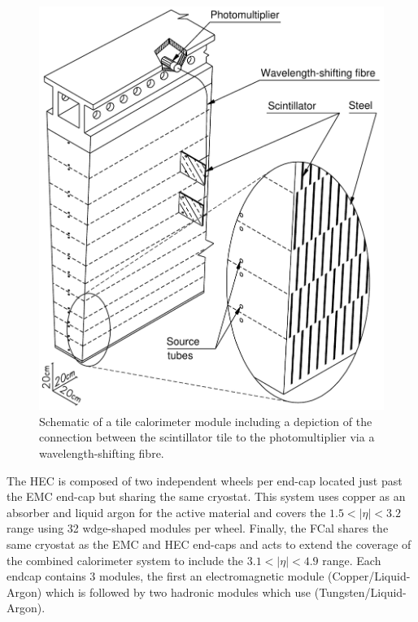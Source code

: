 \begin{figure}[!htbp]
  \begin{center}
    \includegraphics[width=0.8\linewidth]{figures/atlas/tile_calorimeter.pdf}
    \caption{ \cite{PERF-2007-01} Schematic of a tile calorimeter module
including a depiction of the connection between the scintillator tile to the
photomultiplier via a wavelength-shifting fibre.}
    \label{fig:tile_calorimeter}
  \end{center}
\end{figure}

The HEC is composed of two independent wheels per end-cap located just past the
EMC end-cap but sharing the same cryostat. This system  uses copper as an
absorber and liquid argon for the active material and covers the $1.5 < |\eta| <
3.2$ range using 32 wdge-shaped modules per wheel. Finally, the FCal shares the
same cryostat as the EMC and HEC end-caps and acts to extend the coverage of the
combined calorimeter system to include the $3.1 < |\eta| < 4.9$ range.  Each
endcap contains 3 modules, the first an electromagnetic module
(Copper/Liquid-Argon) which is followed by two hadronic modules which use
(Tungsten/Liquid-Argon).
